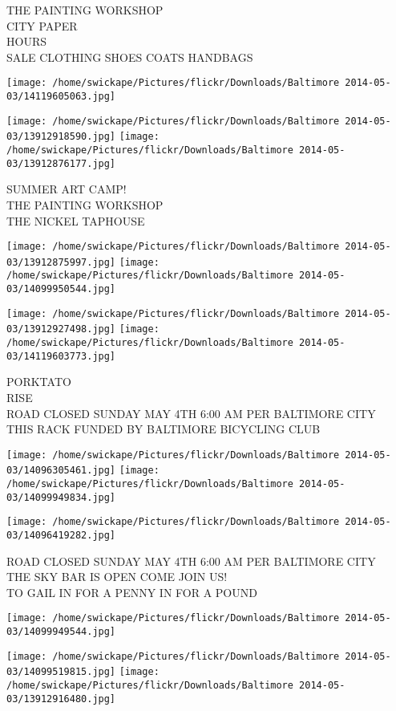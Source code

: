 \documentclass[10pt,letterpaper]{article}
\begin{document}
THE PAINTING WORKSHOP\\
CITY PAPER\\
HOURS\\
SALE CLOTHING SHOES COATS HANDBAGS
\pagebreak

\texttt{[image: /home/swickape/Pictures/flickr/Downloads/Baltimore 2014-05-03/14119605063.jpg]}

\vspace{0.25in}
\texttt{[image: /home/swickape/Pictures/flickr/Downloads/Baltimore 2014-05-03/13912918590.jpg]}
\texttt{[image: /home/swickape/Pictures/flickr/Downloads/Baltimore 2014-05-03/13912876177.jpg]}

SUMMER ART CAMP!\\
THE PAINTING WORKSHOP\\
THE NICKEL TAPHOUSE
\pagebreak

\texttt{[image: /home/swickape/Pictures/flickr/Downloads/Baltimore 2014-05-03/13912875997.jpg]}
\texttt{[image: /home/swickape/Pictures/flickr/Downloads/Baltimore 2014-05-03/14099950544.jpg]}

\texttt{[image: /home/swickape/Pictures/flickr/Downloads/Baltimore 2014-05-03/13912927498.jpg]}
\texttt{[image: /home/swickape/Pictures/flickr/Downloads/Baltimore 2014-05-03/14119603773.jpg]}

PORKTATO\\
RISE\\
ROAD CLOSED SUNDAY MAY 4TH 6:00 AM PER BALTIMORE CITY\\
THIS RACK FUNDED BY BALTIMORE BICYCLING CLUB
\pagebreak

\texttt{[image: /home/swickape/Pictures/flickr/Downloads/Baltimore 2014-05-03/14096305461.jpg]}
\texttt{[image: /home/swickape/Pictures/flickr/Downloads/Baltimore 2014-05-03/14099949834.jpg]}

\texttt{[image: /home/swickape/Pictures/flickr/Downloads/Baltimore 2014-05-03/14096419282.jpg]}

ROAD CLOSED SUNDAY MAY 4TH 6:00 AM PER BALTIMORE CITY\\
THE SKY BAR IS OPEN COME JOIN US!\\
TO GAIL IN FOR A PENNY IN FOR A POUND
\pagebreak

\texttt{[image: /home/swickape/Pictures/flickr/Downloads/Baltimore 2014-05-03/14099949544.jpg]}

\vspace{0.25in}
\texttt{[image: /home/swickape/Pictures/flickr/Downloads/Baltimore 2014-05-03/14099519815.jpg]}
\texttt{[image: /home/swickape/Pictures/flickr/Downloads/Baltimore 2014-05-03/13912916480.jpg]}
\end{document}
